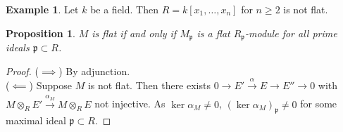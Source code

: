 \documentclass[12pt]{report}
\theoremstyle{plain}
\newtheorem{proposition}[theorem]{Proposition}
\theoremstyle{remark}
\theoremstyle{definition}
\newtheorem{example}[theorem]{Example}
\begin{document}
\begin{example}
    Let $k$ be a field. Then $R=k[x_1,\dots,x_n]$ for $n\ge 2$ is not flat.
\end{example}

\begin{proposition}
    $M$ is flat if and only if $M_\mathfrak{p}$ is a flat $R_\mathfrak{p}$-module for all prime ideals $\mathfrak{p}\subset R$.
\end{proposition}
\begin{proof}
    ($\implies$) By adjunction. \\
    ($\impliedby$) Suppose $M$ is not flat. Then there exists $0\to E'\xrightarrow[]{\alpha}E\to E''\to 0$ with $M\otimes_R E'\xrightarrow[]{\alpha_M}M\otimes_R E$ not injective. As $\ker\alpha_M\neq 0$, $(\ker\alpha_M)_\mathfrak{p}\neq 0$ for some maximal ideal $\mathfrak{p}\subset R$.
\end{proof}
\end{document}
